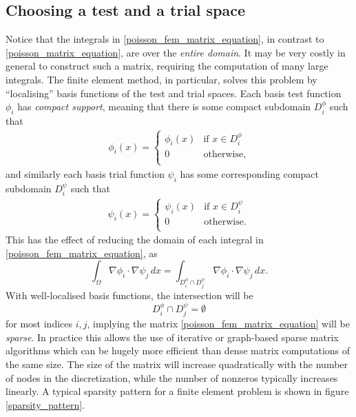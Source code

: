 \subsection{Choosing a test and a trial space}
Notice that the integrals in \eqref{poisson_fem_matrix_equation}, in contrast to \eqref{poisson_matrix_equation},
are over the \textit{entire domain}. It may be very costly in general to construct such a matrix, requiring
the computation of many large integrals. The finite element method, in particular, solves this problem
by ``localising'' basis functions of the test and trial spaces. Each basis test function $\phi_i$
has \textit{compact support}, meaning that there is some compact subdomain $D^\phi_i$ such that
\begin{align*}
    \phi_i(x) =
    \left\{\begin{array}{lr}
        \phi_i(x) &\text{if $x \in D^\phi_i$}\\
        0 &\text{otherwise},\\
    \end{array}\right.
\end{align*}
and similarly each basis trial function $\psi_i$ has some corresponding compact subdomain $D^\psi_i$ such that
\begin{align*}
    \psi_i(x) =
    \left\{\begin{array}{lr}
        \psi_i(x) &\text{if $x \in D^\psi_i$}\\
        0 &\text{otherwise}.\\
    \end{array}\right.
\end{align*}
This has the effect of reducing the domain of each integral in \eqref{poisson_fem_matrix_equation}, as
    $$\int_\Omega \nabla\phi_i \cdot \nabla\psi_j\,dx = \int_{D_i^\phi \cap D_j^\psi} \nabla\phi_i \cdot \nabla\psi_j\,dx. $$
With well-localised basis functions, the intersection will be
    $$D_i^\phi \cap D_j^\psi = \emptyset$$
for most indices $i,j$, implying the matrix \eqref{poisson_fem_matrix_equation} will be \textit{sparse}. In practice this allows
the use of iterative or graph-based sparse matrix algorithms which can be hugely more efficient than dense matrix computations of the same size.
The size of the matrix will increase quadratically with the number of nodes in the discretization, while the number of nonzeros
typically increases linearly.
A typical sparsity pattern for a finite element problem is shown in figure \ref{sparsity_pattern}.


